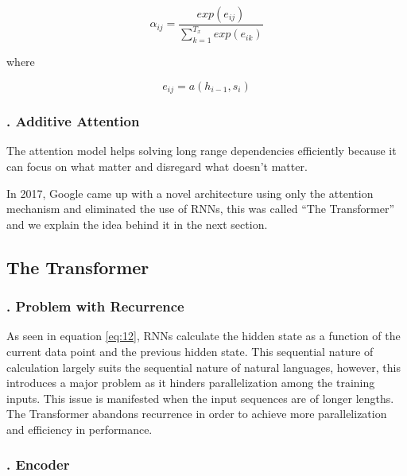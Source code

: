 \begin{equation}
\label{eq:19}
\alpha_{ij} = \frac{ exp(e_{ij}) }{ \sum_{k=1}^{T_x} exp(e_{ik}) }
\end{equation}

where 


\begin{equation}
\label{eq:20}
e_{ij} = a(h_{i-1}, s_i)
\end{equation}

\subsubsection{. Additive Attention} 
\label{bg:subsub100}


The attention model helps solving long range dependencies efficiently because it can focus on what matter and disregard what doesn't matter. 

In 2017, Google came up with a novel architecture using only the attention mechanism and eliminated the use of \ac{RNN}s, this was called \enquote{The Transformer} and we explain the idea behind it in the next section.

\subsection{The Transformer} 
\label{bg:sub10}

\subsubsection{. Problem with Recurrence} 
\label{bg:subsub11}
As seen in equation \ref{eq:12}, \ac{RNNs} calculate the hidden state as a function of the current data point and the previous hidden state. This sequential nature of calculation largely suits the sequential nature of natural languages, however, this introduces a major problem as it hinders parallelization among the training inputs. This issue is manifested when the input sequences are of longer lengths. The Transformer abandons recurrence in order to achieve more parallelization and efficiency in performance.

\subsubsection{. Encoder} 
\label{bg:subsub12}

